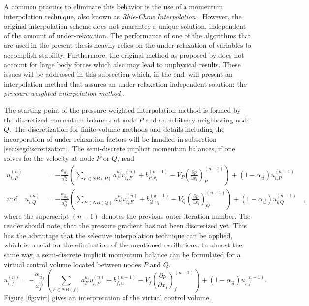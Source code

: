 A common practice to eliminate this behavior is the use of a momentum interpolation technique, also known as \emph{Rhie-Chow Interpolation} \cite{rhie82}. However, the original interpolation scheme does not guarantee a unique solution, independent of the amount of under-relaxation. The performance of one of the algorithms that are used in the present thesis heavily relies on the under-relaxation of variables to accomplish stability. Furthermore, the original method as proposed by \cite{rhie82} does not account for large body forces which also may lead to unphysical results. These issues will be addressed in this subsection which, in the end, will present an interpolation method that assures an under-relaxation independent solution: the \emph{pressure-weighted interpolation method} \cite{miller88}.

The starting point of the pressure-weighted interpolation method is formed by the discretized momentum balances at node \(P\) and an arbitrary neighboring node \(Q\). The discretization for finite-volume methods and details including the incorporation of under-relaxation factors will be handled in subsection \ref{sec:segdiscretization}. The semi-discrete implicit momentum balances, if one solves for the velocity at node \(P\) or \(Q\), read
\begin{align*}
    u_{i,P}^{(n)} 
    &= 
    - \frac{\alpha_{\vec{u}_P}}{a_P^{u_i}} \left(\sum_{F \in NB(P)} a_F^{u_i} u_{i,F}^{(n)}
    +                                     b_{P,u_i}^{(n-1)} 
    -                                     V_P\left(\frac{\partial p}{\partial x_i}\right)_P^{(n-1)} \right)
    + \left(1 - \alpha_{\vec{u}}\right) u_{i,P}^{(n-1)}  \\[1em]
    \text{and} \quad
    u_{i,Q}^{(n)} 
    &= 
    - \frac{\alpha_{\vec{u}_Q}}{a_Q^{u_i}} \left(\sum_{F \in NB(Q)} a_F^{u_i} u_{i,F}^{(n)}
    +                                     b_{Q,u_i}^{(n-1)} 
    -                                     V_Q\left(\frac{\partial p}{\partial x_i}\right)_Q^{(n-1)}   \right)
    + \left(1 - \alpha_{\vec{u}}\right) u_{i,Q}^{(n-1)} \quad,
\end{align*}
where the superscript \((n-1)\) denotes the previous outer iteration number. The reader should note, that the pressure gradient has not been discretized yet. This has the advantage that the selective interpolation technique \cite{schaefer99} can be applied, which is crucial for the elimination of the mentioned oscillations. In almost the same way, a semi-discrete implicit momentum balance can be formulated for a virtual control volume located between nodes \(P\) and \(Q\). \begin{equation}
  \label{eq:virtualu}
  u_{i,f}^{(n)} 
  = 
  - \frac{\alpha_{\vec{u}_f}}{a_f^{u_i}} \left(\sum_{F \in NB(f)} a_F^{u_i} u_{i,F}^{(n)} 
  +                                     b_{f,u_i}^{(n-1)} 
  -                                     V_f\left(\frac{\partial p}{\partial x_i}\right)_f^{(n-1)}  \right)
  + \left(1 - \alpha_{\vec{u}}\right) u_{i,f}^{(n-1)}.
\end{equation}
Figure \ref{fig:virt} gives an interpretation of the virtual control volume.

